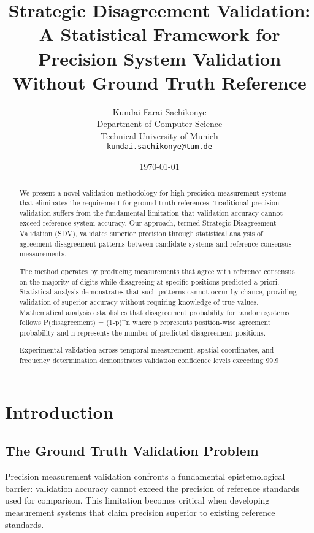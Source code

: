 \documentclass[12pt,a4paper]{article}
\title{Strategic Disagreement Validation: A Statistical Framework for Precision System Validation Without Ground Truth Reference}
\author{
Kundai Farai Sachikonye\\
Department of Computer Science\\
Technical University of Munich\\
\texttt{kundai.sachikonye@tum.de}
}
\date{\today}
\begin{document}
\maketitle

\begin{abstract}
We present a novel validation methodology for high-precision measurement systems that eliminates the requirement for ground truth references. Traditional precision validation suffers from the fundamental limitation that validation accuracy cannot exceed reference system accuracy. Our approach, termed Strategic Disagreement Validation (SDV), validates superior precision through statistical analysis of agreement-disagreement patterns between candidate systems and reference consensus measurements.

The method operates by producing measurements that agree with reference consensus on the majority of digits while disagreeing at specific positions predicted a priori. Statistical analysis demonstrates that such patterns cannot occur by chance, providing validation of superior accuracy without requiring knowledge of true values. Mathematical analysis establishes that disagreement probability for random systems follows P(disagreement) = (1-p)^n where p represents position-wise agreement probability and n represents the number of predicted disagreement positions.

Experimental validation across temporal measurement, spatial coordinates, and frequency determination demonstrates validation confidence levels exceeding 99.9%
\end{abstract}

\section{Introduction}

\subsection{The Ground Truth Validation Problem}

Precision measurement validation confronts a fundamental epistemological barrier: validation accuracy cannot exceed the precision of reference standards used for comparison. This limitation becomes critical when developing measurement systems that claim precision superior to existing reference standards.
\end{document}
